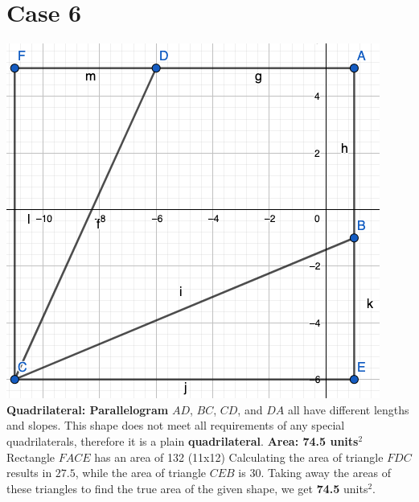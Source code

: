 \documentclass{article}
\begin{document}
	\section*{Case 6}
	\includegraphics[scale=0.4]{pics/Case6} \newline
	\textbf{Quadrilateral: Parallelogram} \newline
	$AD$, $BC$, $CD$, and $DA$ all have different lengths and slopes. \newline
	This shape does not meet all requirements of any special quadrilaterals, therefore it is a plain \textbf{quadrilateral}. \newline \newline
	\textbf{Area: 74.5 units$^2$} \newline
	Rectangle $FACE$ has an area of 132 (11x12) \newline
	Calculating the area of triangle $FDC$ results in $27.5$, while the area of triangle $CEB$ is $30$. \newline
	Taking away the areas of these triangles to find the true area of the given shape, we get \textbf{74.5} units$^2$.
\end{document}

